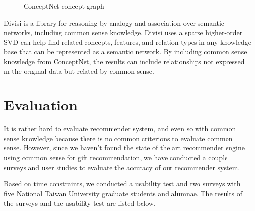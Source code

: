 \documentclass[11pt,twocolumn]{article}
\begin{document}
\begin{figure}[h!t]
\caption{ConceptNet concept graph}
\label{graph}
\end{figure}


{\large Divisi}
is a library for reasoning by analogy and association over semantic networks, including common sense knowledge.
Divisi uses a sparse higher-order SVD can help find related concepts, features, and relation types in any knowledge base that can be represented as a semantic network. By including common sense knowledge from ConceptNet, the results can include relationships not expressed in the original data but related by common sense.


\section{Evaluation}
It is rather hard to evaluate recommender system, and even so with common sense knowledge because there is no
common criterions to evaluate common sense. However, since we haven't found the state of the art recommender engine
using common sense for gift recommendation, we have conducted a couple surveys and user studies to evaluate the accuracy
of our recommender system.

Based on time constraints, we conducted a usability test and two surveys with five National Taiwan University graduate students and alumnae.
The results of the surveys and the usability test are listed below.
\end{document}
